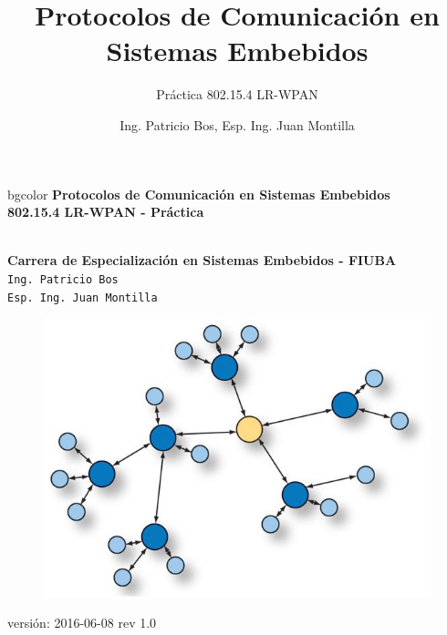 \documentclass[aspectratio=169]{beamer}
\title[802.15.4 LR-WPAN]{Protocolos de Comunicación en Sistemas Embebidos}
\subtitle{Práctica 802.15.4 LR-WPAN}
\author[]{Ing. Patricio Bos, Esp. Ing. Juan Montilla}
\institute[CESE-FIUBA]{Carrera de Especialización en Sistemas Embebidos - FIUBA}
\date{}
\begin{document}

%



\begingroup
\makeatletter
\setlength{\hoffset}{-.5\beamer@sidebarwidth}
\makeatother
\begin{frame}
\begin{center}
\hfill
    \begin{beamercolorbox}[center,dp=3ex,ht=10.25ex, wd=1\linewidth]{bgcolor}
        \Large\textbf{Protocolos de Comunicación en Sistemas Embebidos}\\
        \huge\textbf{802.15.4 LR-WPAN - Práctica}
    \end{beamercolorbox}
\hfill\hfill
\\
\vspace{5px}
\textbf{Carrera de Especialización en Sistemas Embebidos - FIUBA}\\
\vspace{10px}
\texttt{Ing. Patricio Bos}\\
\texttt{Esp. Ing. Juan Montilla}\\

\vspace{10px}

\begin{figure}[H]
	\includegraphics[width=.3\textwidth]{./imagenes/red.jpg}
\end{figure}	  	  	
\vspace{5px}
\tiny versión: 2016-06-08 rev 1.0 

\end{center}
\end{frame}
\endgroup
\end{document}
